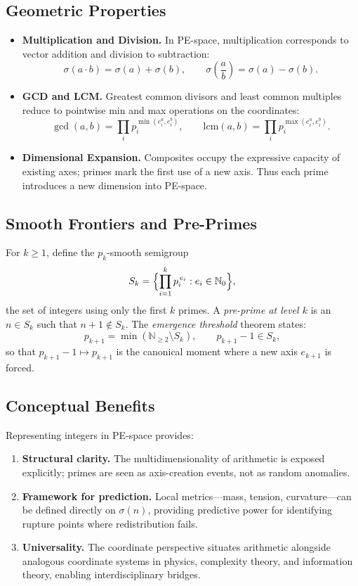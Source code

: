 \documentclass[11pt]{article}
\theoremstyle{plain}
\theoremstyle{definition}
\newcommand{\N}{\mathbb{N}}
\begin{document}
\subsection{Geometric Properties}
\begin{itemize}
  \item \textbf{Multiplication and Division.} In PE-space, multiplication corresponds to vector addition and division to subtraction:
  \[
  \sigma(a \cdot b) = \sigma(a) + \sigma(b), 
  \qquad 
  \sigma\!\left(\frac{a}{b}\right) = \sigma(a) - \sigma(b).
  \]
  \item \textbf{GCD and LCM.} Greatest common divisors and least common multiples reduce to pointwise min and max operations on the coordinates:
  \[
  \gcd(a,b) = \prod_i p_i^{\min(e_i^a,e_i^b)},
  \qquad
  \mathrm{lcm}(a,b) = \prod_i p_i^{\max(e_i^a,e_i^b)}.
  \]
  \item \textbf{Dimensional Expansion.} Composites occupy the expressive capacity of existing axes; primes mark the first use of a new axis. Thus each prime introduces a new dimension into PE-space.
\end{itemize}

\subsection{Smooth Frontiers and Pre-Primes}
For $k \geq 1$, define the $p_k$-smooth semigroup
\[
S_k = \Bigl\{ \prod_{i=1}^k p_i^{\,e_i} : e_i \in \N_0 \Bigr\},
\]
the set of integers using only the first $k$ primes.  
A \emph{pre-prime at level $k$} is an $n \in S_k$ such that $n+1 \notin S_k$.  
The \emph{emergence threshold} theorem states:
\[
p_{k+1} = \min(\N_{\geq 2} \setminus S_k), 
\qquad p_{k+1}-1 \in S_k,
\]
so that $p_{k+1}-1 \mapsto p_{k+1}$ is the canonical moment where a new axis $e_{k+1}$ is forced.

\subsection{Conceptual Benefits}
Representing integers in PE-space provides:
\begin{enumerate}
  \item \textbf{Structural clarity.} The multidimensionality of arithmetic is exposed explicitly; primes are seen as axis-creation events, not as random anomalies.
  \item \textbf{Framework for prediction.} Local metrics—mass, tension, curvature—can be defined directly on $\sigma(n)$, providing predictive power for identifying rupture points where redistribution fails.
  \item \textbf{Universality.} The coordinate perspective situates arithmetic alongside analogous coordinate systems in physics, complexity theory, and information theory, enabling interdisciplinary bridges.
\end{enumerate}
\end{document}
